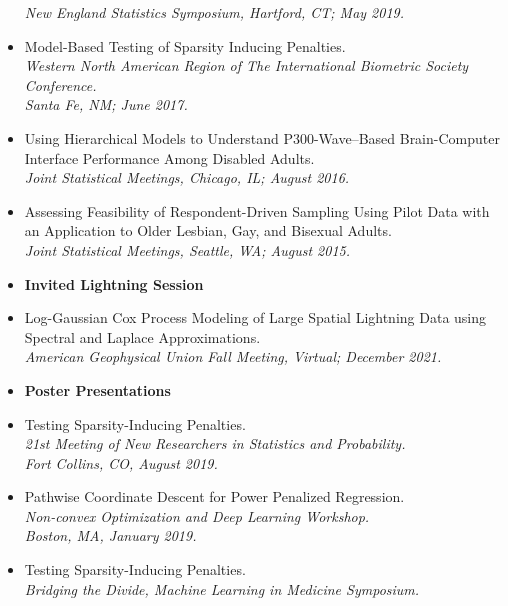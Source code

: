 \documentclass[11pt]{article}
\newcommand{\tab}{\hspace*{2em}}
\begin{document}
\begin{itemize}
	\tab \emph{New England Statistics Symposium, Hartford, CT; May 2019.} \vspace{-2mm}
	\item[] Model-Based Testing of Sparsity Inducing Penalties. \\
	\tab \emph{Western North American Region of The International Biometric Society Conference.} \\
	\tab \emph{Santa Fe, NM; June 2017.} \vspace{-2mm}
	\item[] Using Hierarchical Models to Understand P300-Wave--Based Brain-Computer Interface Performance Among Disabled Adults. \\
	\tab \emph{Joint Statistical Meetings, Chicago, IL; August 2016.} \vspace{-2mm}
	\item[] Assessing Feasibility of Respondent-Driven Sampling Using Pilot Data with an Application to Older Lesbian, Gay, and Bisexual Adults. \\
	\tab \emph{Joint Statistical Meetings, Seattle, WA; August 2015.} 
	\item[] \textbf{Invited Lightning Session}\vspace{-2mm}
	\item[] Log-Gaussian Cox Process Modeling of Large Spatial Lightning Data using Spectral and Laplace Approximations. \\
	\tab \emph{American Geophysical Union Fall Meeting, Virtual; December 2021.}\vspace{-2mm}
	\item[] \textbf{Poster Presentations}\vspace{-2mm}
	\item[] Testing Sparsity-Inducing Penalties. \\
	\tab \emph{21st Meeting of New Researchers in 
Statistics and Probability.}\\ 
	\tab \emph{Fort Collins, CO, August 2019.} \vspace{-2mm}
	\item[] Pathwise Coordinate Descent for Power Penalized Regression. \\
	\tab \emph{Non-convex Optimization and Deep Learning Workshop.}\\ 
	\tab \emph{Boston, MA, January 2019.} \vspace{-2mm}
	\item[] Testing Sparsity-Inducing Penalties. \\
	\tab \emph{Bridging the Divide, Machine Learning in Medicine Symposium.}\\ 

\end{itemize}
\end{document}
